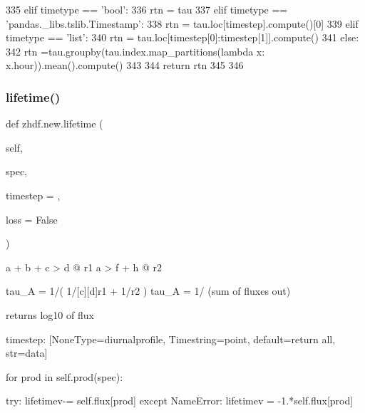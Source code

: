 \begin{DoxyCode}
335                 \textcolor{keywordflow}{elif} timetype == \textcolor{stringliteral}{'bool'}:
336                     rtn = tau
337                 \textcolor{keywordflow}{elif} timetype == \textcolor{stringliteral}{'pandas.\_libs.tslib.Timestamp'}:
338                     rtn = tau.loc[timestep].compute()[0]
339                 \textcolor{keywordflow}{elif} timetype == \textcolor{stringliteral}{'list'}:
340                     rtn = tau.loc[timestep[0]:timestep[1]].compute()
341                 \textcolor{keywordflow}{else}:
342                     rtn =tau.groupby(tau.index.map\_partitions(\textcolor{keyword}{lambda} x: x.hour)).mean().compute()
343 
344                 \textcolor{keywordflow}{return} rtn
345 
346 
\end{DoxyCode}
\mbox{\label{classzhdf_1_1new_aa7d832d1f91a699ea51a319ac87e2a84}} 
\subsubsection{\texorpdfstring{lifetime()}{lifetime()}\hspace{0.1cm}{\footnotesize\ttfamily [2/3]}}
{\footnotesize\ttfamily def zhdf.\+new.\+lifetime (\begin{DoxyParamCaption}\item[{}]{self,  }\item[{}]{spec,  }\item[{}]{timestep = {\ttfamily \textquotesingle{}\textquotesingle{}},  }\item[{}]{loss = {\ttfamily False} }\end{DoxyParamCaption})}

\begin{DoxyVerb}a + b + c > d     @ r1
a         > f + h @ r2

tau_A = 1/(   1/[c][d]r1   + 1/r2      )
tau_A = 1/ (sum of fluxes out)


returns log10 of flux


timestep: [NoneType=diurnalprofile, Timestring=point, default=return all, str=data]
\end{DoxyVerb}
\begin{DoxyVerb}for prod in self.prod(spec):

    try:
        lifetimev-= self.flux[prod]
    except NameError:
        lifetimev  = -1.*self.flux[prod]\end{DoxyVerb}
 
